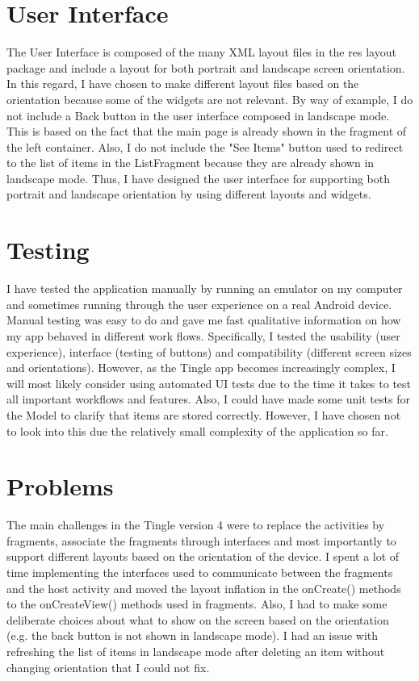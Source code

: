 \documentclass{article}
\begin{document}
\section{User Interface}
 
The User Interface is composed of the many XML layout files in the res layout package and include a layout for both portrait and landscape screen orientation. In this regard, I have chosen to make different layout files based on the orientation because some of the widgets are not relevant. By way of example, I do not include a Back button in the user interface composed in landscape mode. This is based on the fact that the main page is already shown in the fragment of the left container. Also, I do not include the "See Items" button used to redirect to the list of items in the ListFragment because they are already shown in landscape mode. Thus, I have designed the user interface for supporting both portrait and landscape orientation by using different layouts and widgets. 

\section{Testing}

I have tested the application manually by running an emulator on my computer and sometimes running through the user experience on a real Android device. Manual testing was easy to do and gave me fast qualitative information on how my app behaved in different work flows. Specifically, I tested the usability (user experience), interface (testing of buttons) and compatibility (different screen sizes and orientations). However, as the Tingle app becomes increasingly complex, I will most likely consider using automated UI tests due to the time it takes to test all important workflows and features. Also, I could have made some unit tests for the Model to clarify that items are stored correctly. However, I have chosen not to look into this due the relatively small complexity of the application so far. 

\section{Problems}

The main challenges in the Tingle version 4 were to replace the activities by fragments, associate the fragments through interfaces and most importantly to support different layouts based on the orientation of the device. I spent a lot of time implementing the interfaces used to communicate between the fragments and the host activity and moved the layout inflation in the onCreate() methods to the onCreateView() methods used in fragments. Also, I had to make some deliberate choices about what to show on the screen based on the orientation (e.g. the back button is not shown in landscape mode). I had an issue with refreshing the list of items in landscape mode after deleting an item without changing orientation that I could not fix. 
\end{document}
